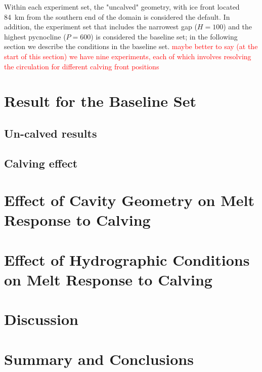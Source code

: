 \documentclass[draft]{agujournal2019}
\newcommand{\red}[1]{\textcolor{red}{#1}}
\begin{document}
Within each experiment set, the "uncalved" geometry, with ice front located 84~km from the southern end of the domain is considered the default. In addition, the experiment set that includes the narrowest gap ($H = 100$) and the highest pycnocline ($P = 600$) is considered the baseline set; in the following section we describe the conditions in the baseline set. \red{maybe better to say (at the start of this section) we have nine experiments, each of which involves resolving the circulation for different calving front positions}

\section{Result for the Baseline Set}\label{S:Baseline}
\subsection{Un-calved results}
\subsection{Calving effect}

\section{Effect of Cavity Geometry on Melt Response to Calving}

\section{Effect of Hydrographic Conditions on Melt Response to Calving}

\section{Discussion}

\section{Summary and Conclusions}
\end{document}
